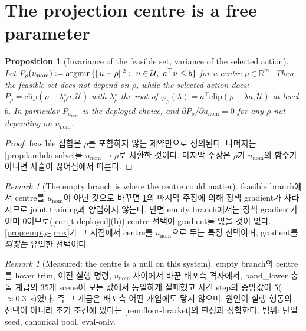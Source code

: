 \documentclass[11pt]{article}
\theoremstyle{plain}
\newtheorem{proposition}[theorem]{Proposition}
\theoremstyle{definition}
\theoremstyle{remark}
\newtheorem{remark}[theorem]{Remark}
\newcommand{\R}{\mathbb{R}}
\DeclarePairedDelimiter{\norm}{\lVert}{\rVert}
\newcommand{\calU}{\mathcal{U}}
\newcommand{\eqdef}{:=}
\begin{document}
\section{The projection centre is a free parameter}\label{sec:center}

\begin{proposition}[Invariance of the feasible set, variance of the selected action]\label{prop:center-inv}
Let $P_\rho(u_{\mathrm{nom}})\eqdef\operatorname{argmin}\{\norm{u-\rho}^2:\ u\in\calU,\
a^\top u\le b\}$ for a centre $\rho\in\R^m$. Then the feasible set does not depend on $\rho$,
while the selected action does: $P_\rho=\mathrm{clip}(\rho-\lambda^\star_\rho a,\calU)$ with
$\lambda^\star_\rho$ the root of $\varphi_\rho(\lambda)=a^\top\mathrm{clip}(\rho-\lambda a,\calU)$
at level $b$. In particular $P_{u_{\mathrm{nom}}}$ is the deployed choice, and
$\partial P_\rho/\partial u_{\mathrm{nom}}=0$ for any $\rho$ not depending on $u_{\mathrm{nom}}$.
\end{proposition}
\begin{proof}
feasible 집합은 $\rho$를 포함하지 않는 제약만으로 정의된다. 나머지는 \cref{prop:lambda-solve}를
$u_{\mathrm{nom}}\to\rho$로 치환한 것이다. 마지막 주장은 $\rho$가 $u_{\mathrm{nom}}$의 함수가
아니면 사슬이 끊어짐에서 따른다.
\end{proof}

\begin{remark}[The empty branch is where the centre could matter]\label{rem:center-empty}
feasible branch에서 centre를 $u_{\mathrm{nom}}$이 아닌 것으로 바꾸면 \cref{prop:center-inv}의
마지막 주장에 의해 정책 gradient가 사라지므로 joint training과 양립하지 않는다. 반면 empty
branch에서는 정책 gradient가 이미 $0$이므로(\cref{cor:jt-deployed}(b)) centre 선택이 gradient를
잃을 것이 없다. \cref{prop:empty-prox}가 그 지점에서 centre를 $u_{\mathrm{nom}}$으로 두는 특정
선택이며, gradient를 \emph{되찾는} 유일한 선택이다.
\end{remark}

\begin{remark}[Measured: the centre is a null on this system]\label{rem:rho-null}
empty branch의 centre를 hover trim, 이전 실행 명령, $u_{\mathrm{nom}}$ 사이에서 바꾼 배포측
격자에서, band\_lower 충돌 계급의 $35$개 scene이 모든 값에서 동일하게 실패했고 사건 step의
중앙값이 $5$($\approx0.3$~s)였다. 즉 그 계급은 배포측 어떤 개입에도 닿지 않으며, 원인이 실행
행동의 선택이 아니라 초기 조건에 있다는 \cref{rem:floor-bracket}의 판정과 정합한다. 범위:
단일 seed, canonical pool, eval-only.
\end{remark}
\end{document}
